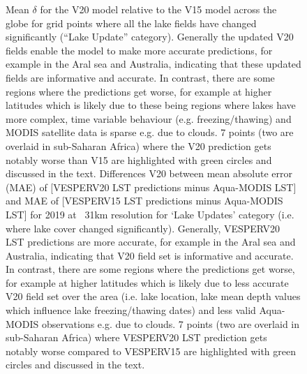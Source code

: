 \documentclass[hess, manuscript]{copernicus}
\begin{document}
\begin{figure}[t]
	\caption{Mean $\delta$ for the V20 model relative to the V15 model across the globe for grid points where all the lake fields have changed significantly (``Lake Update'' category). Generally the updated V20 fields enable the model to make more accurate predictions, for example in the Aral sea and Australia, indicating that these updated fields are informative and accurate. In contrast, there are some regions where the predictions get worse,  for example at higher latitudes which is likely due to these being regions where lakes have more complex, time variable behaviour (e.g. freezing/thawing) and MODIS satellite data is sparse e.g. due to clouds. 7 points (two are overlaid in sub-Saharan Africa) where the V20 prediction gets notably worse than V15 are highlighted with green circles and discussed in the text. \newline Differences V20 between mean absolute error (MAE) of [VESPERV20 LST predictions minus Aqua-MODIS LST] and MAE of [VESPERV15 LST predictions minus Aqua-MODIS LST] for 2019 at ~31km resolution for ‘Lake Updates’ category (i.e. where lake cover changed significantly). Generally, VESPERV20 LST predictions are more accurate, for example in the Aral sea and Australia, indicating that V20 field set is informative and accurate. In contrast, there are some regions where the predictions get worse, for example at higher latitudes which is likely due to less accurate V20 field set over the area (i.e. lake location, lake mean depth values which influence lake freezing/thawing dates) and less valid Aqua-MODIS observations e.g. due to clouds. 7 points (two are overlaid in sub-Saharan Africa) where VESPERV20 LST prediction gets notably worse compared to VESPERV15 are highlighted with green circles and discussed in the text.}
	\label{fig:bitstring_100110}
\end{figure}
\end{document}
